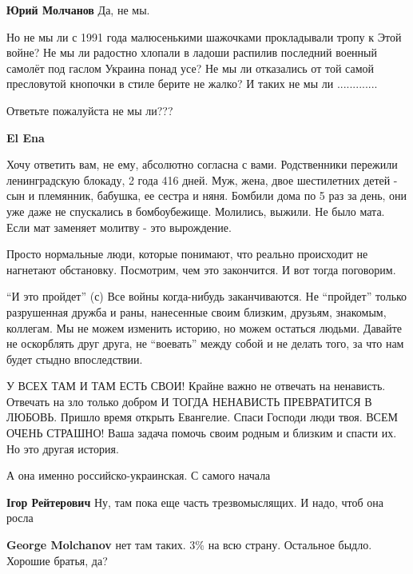 \begin{itemize}
\begin{itemize}
\textbf{Юрий Молчанов}
Да, не мы.

Но не мы ли с 1991 года малюсенькими шажочками прокладывали тропу к Этой войне?
Не мы ли радостно хлопали в ладоши распилив последний военный самолёт под
гаслом Украина понад усе? Не мы ли отказались от той самой пресловутой кнопочки
в стиле берите не жалко? И таких не мы ли .............

Ответьте пожалуйста не мы ли???

\textbf{El Ena} 

Хочу ответить вам, не ему, абсолютно согласна с вами. Родственники пережили
ленинградскую блокаду, 2 года 416 дней. Муж, жена, двое шестилетних детей - сын
и племянник, бабушка, ее сестра и няня. Бомбили дома по 5 раз за день, они уже
даже не спускались в бомбоубежище. Молились, выжили. Не было мата. Если мат
заменяет молитву - это вырождение.

\end{itemize} %


Просто нормальные люди, которые понимают, что реально происходит не нагнетают
обстановку. Посмотрим, чем это закончится. И вот тогда поговорим.



\enquote{И это пройдет} (с) Все войны когда-нибудь заканчиваются. Не \enquote{пройдет} только
разрушенная дружба и раны, нанесенные своим близким, друзьям, знакомым,
коллегам. Мы не можем изменить историю, но можем остаться людьми. Давайте не
оскорблять друг друга, не \enquote{воевать} между собой и не делать того, за что нам
будет стыдно впоследствии.


У ВСЕХ ТАМ И ТАМ ЕСТЬ СВОИ!
Крайне важно не отвечать на ненависть.
Отвечать на зло только добром
И ТОГДА НЕНАВИСТЬ ПРЕВРАТИТСЯ В ЛЮБОВЬ.
Пришло время открыть Евангелие. Спаси Господи люди твоя.
ВСЕМ ОЧЕНЬ СТРАШНО!
Ваша задача помочь своим родным и близким и спасти их.
Но это другая история.


А она именно российско-украинская. С самого начала

\begin{itemize} %
\textbf{Ігор Рейтерович} Ну, там пока еще часть трезвомыслящих. И надо, чтоб она росла

\textbf{George Molchanov} нет там таких. 3\% на всю страну. Остальное быдло. Хорошие братья, да?


\end{itemize}
\end{itemize}

